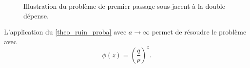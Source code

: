 \begin{figure}[ht!]
\begin{center}
\begin{tikzpicture}
\end{tikzpicture}
\end{center}
\caption{Illustration du problème de premier passage sous-jacent à la double dépense.}
\label{fig:double_spending_time}
\end{figure}
L'application du \cref{theo_ruin_proba} avec $a\rightarrow \infty$ permet de résoudre le problème avec 
$$
\phi(z) = \left(\frac qp\right)^z.
$$


